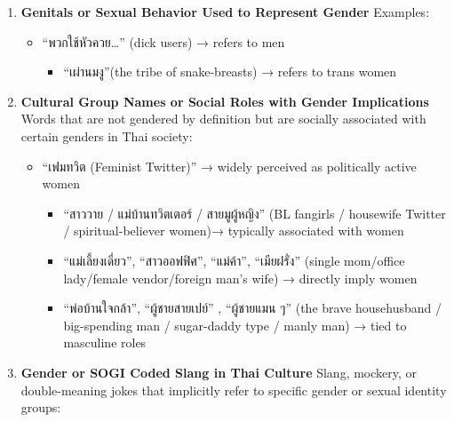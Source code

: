 \documentclass[12pt,oneside,openright,a4paper]{cpe-english-project}
\begin{document}
\begin{enumerate}
\setlength{\itemsep}{0.15\baselineskip}
\setlength{\parsep}{0pt}
\setlength{\parskip}{0pt}
\def\labelenumi{\arabic{enumi})}
\item
  \textbf{Genitals or Sexual Behavior Used to Represent Gender}
  Examples:

  \begin{itemize}
\setlength{\itemsep}{0.15\baselineskip}
\setlength{\parsep}{0pt}
\setlength{\parskip}{0pt}
    \item
    ``พวกใช้หัวควย\ldots'' (dick users) → refers to men

    \begin{itemize}
\setlength{\itemsep}{0.15\baselineskip}
\setlength{\parsep}{0pt}
\setlength{\parskip}{0pt}
        \item
      ``เผ่านมงู''(the tribe of snake-breasts) → refers to trans women
    \end{itemize}
  \end{itemize}
\item
  \textbf{Cultural Group Names or Social Roles with Gender
  Implications}
  Words that are not gendered by definition but are socially associated
  with certain genders in Thai society:

  \begin{itemize}
\setlength{\itemsep}{0.15\baselineskip}
\setlength{\parsep}{0pt}
\setlength{\parskip}{0pt}
    \item
    ``เฟมทวิต (Feminist Twitter)'' → widely perceived as politically
    active women

    \begin{itemize}
\setlength{\itemsep}{0.15\baselineskip}
\setlength{\parsep}{0pt}
\setlength{\parskip}{0pt}
        \item
      ``สาววาย / แม่บ้านทวิตเตอร์ / สายมูผู้หญิง''
      (BL fangirls / housewife Twitter / spiritual-believer women)→
      typically associated with women
    \item
      ``แม่เลี้ยงเดี่ยว'', ``สาวออฟฟิศ'', ``แม่ค้า'', ``เมียฝรั่ง''
      (single mom/office lady/female vendor/foreign man's wife) →
      directly imply women
    \item
      ``พ่อบ้านใจกล้า'', ``ผู้ชายสายเปย์'' , ``ผู้ชายแมน ๆ''
      (the brave househusband / big-spending man / sugar-daddy type /
      manly man) → tied to masculine roles
    \end{itemize}
  \end{itemize}
\item
  \textbf{Gender or SOGI Coded Slang in Thai Culture}
  Slang, mockery, or double-meaning jokes that implicitly refer to
  specific gender or sexual identity groups:


\end{enumerate}
\end{document}
